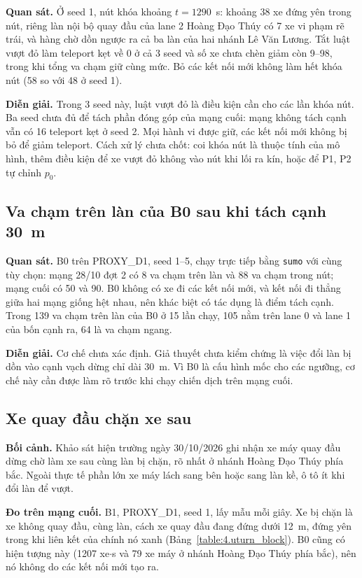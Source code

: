 \documentclass[../DoAn.tex]{subfiles}
\begin{document}
\textbf{Quan sát.} Ở seed 1, nút khóa khoảng $t = 1290$~s: khoảng 38 xe đứng yên trong nút, riêng làn nội bộ quay đầu của lane 2 Hoàng Đạo Thúy có 7 xe vi phạm rẽ trái, và hàng chờ dồn ngược ra cả ba làn của hai nhánh Lê Văn Lương. Tắt luật vượt đỏ làm teleport kẹt về 0 ở cả 3 seed và số xe chưa chèn giảm còn 9--98, trong khi tổng va chạm giữ cùng mức. Bỏ các kết nối mới không làm hết khóa nút (58 so với 48 ở seed 1).

\textbf{Diễn giải.} Trong 3 seed này, luật vượt đỏ là điều kiện cần cho các lần khóa nút. Ba seed chưa đủ để tách phần đóng góp của mạng cuối: mạng không tách cạnh vẫn có 16 teleport kẹt ở seed 2. Mọi hành vi được giữ, các kết nối mới không bị bỏ để giảm teleport. Cách xử lý chưa chốt: coi khóa nút là thuộc tính của mô hình, thêm điều kiện để xe vượt đỏ không vào nút khi lối ra kín, hoặc để P1, P2 tự chỉnh $p_0$.

\subsection{Va chạm trên làn của B0 sau khi tách cạnh 30~m}
\label{subsection:split_collisions}

\textbf{Quan sát.} B0 trên PROXY\_D1, seed 1--5, chạy trực tiếp bằng \texttt{sumo} với cùng tùy chọn: mạng 28/10 đợt 2 có 8 va chạm trên làn và 88 va chạm trong nút; mạng cuối có 50 và 90. B0 không có xe đi các kết nối mới, và kết nối đi thẳng giữa hai mạng giống hệt nhau, nên khác biệt có tác dụng là điểm tách cạnh. Trong 139 va chạm trên làn của B0 ở 15 lần chạy, 105 nằm trên lane 0 và lane 1 của bốn cạnh ra, 64 là va chạm ngang.

\textbf{Diễn giải.} Cơ chế chưa xác định. Giả thuyết chưa kiểm chứng là việc đổi làn bị dồn vào cạnh vạch dừng chỉ dài 30~m. Vì B0 là cấu hình mốc cho các ngưỡng, cơ chế này cần được làm rõ trước khi chạy chiến dịch trên mạng cuối.

\subsection{Xe quay đầu chặn xe sau}
\label{subsection:uturn}

\textbf{Bối cảnh.} Khảo sát hiện trường ngày 30/10/2026 ghi nhận xe máy quay đầu dừng chờ làm xe sau cùng làn bị chặn, rõ nhất ở nhánh Hoàng Đạo Thúy phía bắc. Ngoài thực tế phần lớn xe máy lách sang bên hoặc sang làn kề, ô tô ít khi đổi làn để vượt.

\textbf{Đo trên mạng cuối.} B1, PROXY\_D1, seed 1, lấy mẫu mỗi giây. Xe bị chặn là xe không quay đầu, cùng làn, cách xe quay đầu đang đứng dưới 12~m, đứng yên trong khi liên kết của chính nó xanh (Bảng~\ref{table:4.uturn_block}). B0 cũng có hiện tượng này (1207 xe$\cdot$s và 79 xe máy ở nhánh Hoàng Đạo Thúy phía bắc), nên nó không do các kết nối mới tạo ra.
\end{document}
